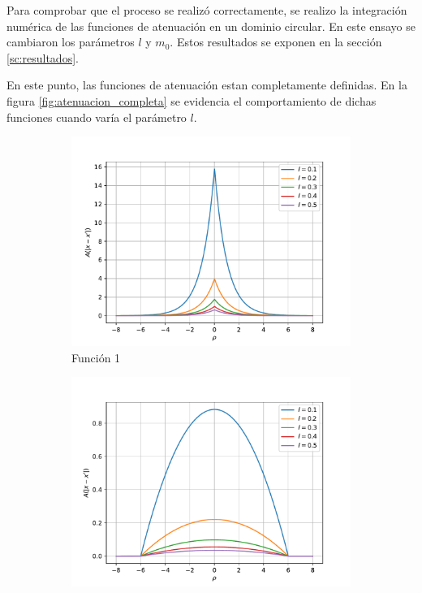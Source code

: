 Para comprobar que el proceso se realizó correctamente, se realizo la integración numérica de las funciones de atenuación en un dominio circular. En este ensayo se cambiaron los parámetros $l$ y $m_0$. Estos resultados se exponen en la sección \ref{sc:resultados}.

En este punto, las funciones de atenuación estan completamente definidas. En la figura \ref{fig:atenuacion_completa} se evidencia el comportamiento de dichas funciones cuando varía el parámetro $l$.

\begin{figure}
    \centering
    \sffamily
    \begin{subfigure}{0.48\textwidth}
    \centering
        \includegraphics[width=\textwidth]{figuras/biexp2dl.pdf}
        \caption{Función 1}
        \label{fig:atenuacion_completa.f1}
    \end{subfigure}
    \begin{subfigure}{0.48\textwidth}
    \centering
        \includegraphics[width=\textwidth]{figuras/campana2dl.pdf}

\end{subfigure}
\end{figure}
